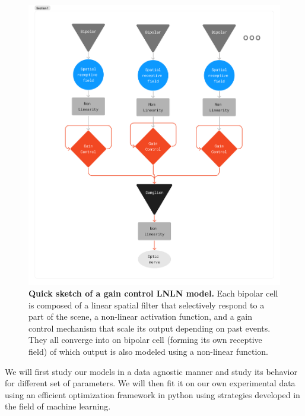 \begin{figure}
    \centering
    \includegraphics[scale = 0.2]{pics/GCModelDiagram.png}
    \caption{\textbf{Quick sketch of a gain control LNLN model.} Each bipolar
        cell is composed of a linear spatial filter that selectively respond to
        a part
        of the scene, a non-linear activation function, and a gain control
        mechanism
        that scale its output depending on past events. They all converge into
        on
        bipolar cell (forming its own receptive field) of which output is also
        modeled
        using a non-linear function.}\label{fig:LNLN}
\end{figure}
We will first study our models in a data agnostic manner and study its behavior
for different set of parameters. We will then fit it on our own experimental
data using an efficient optimization framework in python using strategies
developed in the field of machine learning.